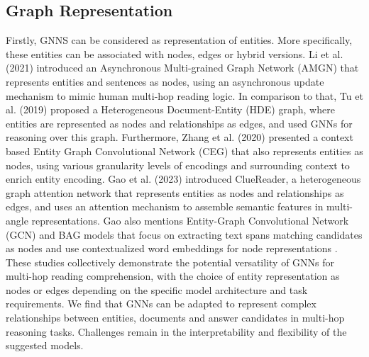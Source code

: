 \documentclass[sigplan,screen,nonacm]{acmart}
\begin{document}
\subsection{Graph Representation}
Firstly, GNNS can be considered as representation of entities. More specifically, these entities can be associated with nodes, edges or hybrid versions. 
Li et al. (2021) \cite{RN131} introduced an Asynchronous Multi-grained Graph Network (AMGN) that represents entities and sentences as nodes, using an asynchronous 
update mechanism to mimic human multi-hop reading logic. In comparison to that, Tu et al. (2019) \cite{RN124} proposed a Heterogeneous Document-Entity (HDE) 
graph, where entities are represented as nodes and relationships as edges, and used GNNs for reasoning over this graph. Furthermore, Zhang et al. (2020) \cite{RN170} presented 
a context based Entity Graph Convolutional Network (CEG) that also represents entities as nodes, using various granularity levels of encodings and surrounding context 
to enrich entity encoding. Gao et al. (2023) \cite{RN136} introduced ClueReader, a heterogeneous graph attention network that represents entities as nodes and
relationships as edges, and uses an attention mechanism to assemble semantic features in multi-angle representations. Gao also mentions Entity-Graph 
Convolutional Network (GCN) and BAG models that focus on extracting text spans matching candidates as nodes and use contextualized word embeddings
for node representations \cite{RN136}. These studies collectively demonstrate the potential versatility of GNNs for multi-hop reading comprehension, with the
choice of entity representation as nodes or edges depending on the specific model architecture and task requirements. We find that GNNs can be adapted
to represent complex relationships between entities, documents and answer candidates in multi-hop reasoning tasks. Challenges remain in the 
interpretability and flexibility of the suggested models.
\end{document}
